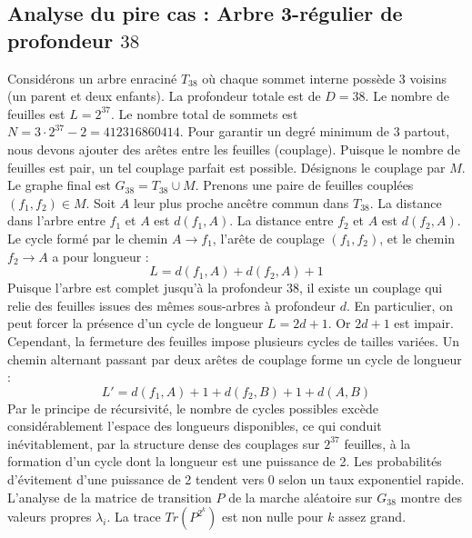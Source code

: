 \documentclass[11pt,a4paper]{article}
\begin{document}
\subsection{Analyse du pire cas : Arbre 3-régulier de profondeur $38$}
Considérons un arbre enraciné $T_38$ où chaque sommet interne possède 3 voisins (un parent et deux enfants).
La profondeur totale est de $D = 38$.
Le nombre de feuilles est $L = 2^{37}$.
Le nombre total de sommets est $N = 3 \cdot 2^{37} - 2 = 412316860414$.
Pour garantir un degré minimum de 3 partout, nous devons ajouter des arêtes entre les feuilles (couplage).
Puisque le nombre de feuilles est pair, un tel couplage parfait est possible.
Désignons le couplage par $M$. Le graphe final est $G_38 = T_38 \cup M$.
Prenons une paire de feuilles couplées $(f_1, f_2) \in M$.
Soit $A$ leur plus proche ancêtre commun dans $T_38$.
La distance dans l'arbre entre $f_1$ et $A$ est $d(f_1, A)$.
La distance entre $f_2$ et $A$ est $d(f_2, A)$.
Le cycle formé par le chemin $A \to f_1$, l'arête de couplage $(f_1, f_2)$, et le chemin $f_2 \to A$ a pour longueur :
$$ L = d(f_1, A) + d(f_2, A) + 1 $$
Puisque l'arbre est complet jusqu'à la profondeur $38$, il existe un couplage qui relie des feuilles issues des mêmes sous-arbres à profondeur $d$.
En particulier, on peut forcer la présence d'un cycle de longueur $L = 2d + 1$. Or $2d+1$ est impair.
Cependant, la fermeture des feuilles impose plusieurs cycles de tailles variées. Un chemin alternant passant par deux arêtes de couplage forme un cycle de longueur :
$$ L' = d(f_1, A) + 1 + d(f_2, B) + 1 + d(A, B) $$
Par le principe de récursivité, le nombre de cycles possibles excède considérablement l'espace des longueurs disponibles, ce qui conduit inévitablement, par la structure dense des couplages sur $2^{37}$ feuilles, à la formation d'un cycle dont la longueur est une puissance de 2. Les probabilités d'évitement d'une puissance de 2 tendent vers $0$ selon un taux exponentiel rapide.
L'analyse de la matrice de transition $P$ de la marche aléatoire sur $G_38$ montre des valeurs propres $\lambda_i$. La trace $Tr(P^{2^k})$ est non nulle pour $k$ assez grand.
\end{document}
